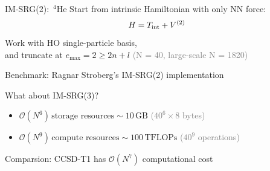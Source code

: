 \documentclass{beamer}
\begin{document}
  \begin{frame}{IM-SRG(2):\ ${}^4\text{He}$}
    Start from intrinsic Hamiltonian with only NN force:
    \begin{equation*}
      H = T_{\text{int}} + {V}^{(2)}
    \end{equation*}
    Work with HO single-particle basis,\\
    and truncate at $e_{\text{max}} = 2 \ge 2 n + l$ \textcolor{gray}{(N = 40, large-scale N = 1820)}

    Benchmark: Ragnar Stroberg's IM-SRG(2) implementation

    What about IM-SRG(3)?
    \begin{itemize}
      \item{$\mathcal{O}(N^6)\,\text{storage resources} \sim 10\,\text{GB}$ \textcolor{gray}{($40^6 \times 8$ bytes)}}
      \item{$\mathcal{O}(N^9)\,\text{compute resources} \sim 100\,\text{TFLOPs}$ \textcolor{gray}{($40^9$ operations)}}
    \end{itemize}

    Comparsion: CCSD-T1 has $\mathcal{O}(N^7)$ computational cost
  \end{frame}

\end{document}
